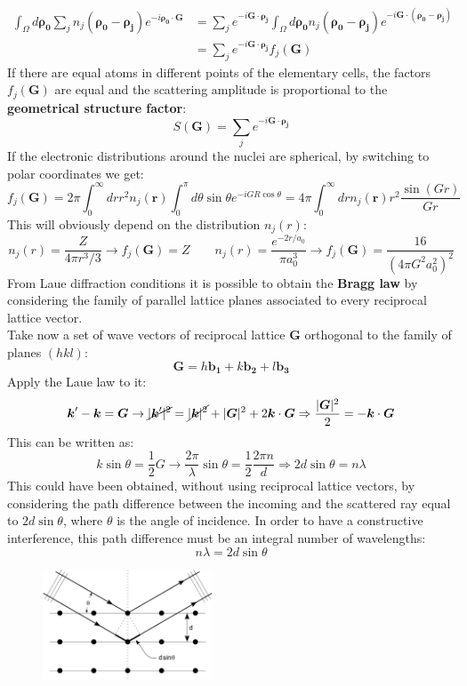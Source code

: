 \documentclass[10.75pt,a4paper,openright,bottom=2cm]{article}
\renewcommand{\Vec}[1]{\boldsymbol{#1}}
\begin{document}
\begin{align*}
\int_\Omega d\Vec{\rho_0}\sum_jn_j(\Vec{\rho_0}-\Vec{\rho_j})e^{-i\Vec{\rho_0}\cdot\Vec{G}}&=\sum_je^{-i\Vec{G}\cdot\Vec{\rho_j}}\int_\Omega d\Vec{\rho_0}n_j(\Vec{\rho_0}-\Vec{\rho_j})e^{-i\Vec{G}\cdot(\Vec{\rho_0}-\Vec{\rho_j})}\\
&=\sum_je^{-i\Vec{G}\cdot\Vec{\rho_j}}f_j(\Vec{G})
\end{align*}
If there are equal atoms in different points of the elementary cells, the factors $f_j(\Vec{G})$ are equal and the scattering amplitude is proportional to the \textbf{geometrical structure factor}:
\[
S(\Vec{G})=\sum_je^{-i\Vec{G}\cdot\Vec{\rho_j}}
\]
If the electronic distributions around the nuclei are spherical, by switching to polar coordinates we get:
\[
f_j(\Vec{G})=2\pi\int_0^\infty drr^2n_j(\Vec{r})\int_0^\pi d\theta\sin\theta e^{-iGR\cos\theta}=4\pi\int_0^\infty drn_j(\Vec{r})r^2\frac{\sin(Gr)}{Gr}
\]
This will obviously depend on the distribution $n_j(r)$:
\[
n_j(r)=\frac{Z}{4\pi r^3/3}\to f_j(\Vec{G})=Z \qquad n_j(r)=\frac{e^{-2r/a_0}}{\pi a_0^3}\to f_j(\Vec{G})=\frac{16}{(4\pi G^2a_0^2)^2}
\]
From Laue diffraction conditions it is possible to obtain the \textbf{Bragg law} by considering the family of parallel lattice planes associated to every reciprocal lattice vector.\\
Take now a set of wave vectors of reciprocal lattice $\Vec{G}$ orthogonal to the family of planes $(hkl)$:
\[
\Vec{G}=h\Vec{b_1}+k\Vec{b_2}+l\Vec{b_3}
\]
Apply the Laue law to it:
\[
\Vec{k}'-\Vec{k}=\Vec{G}\to\cancel{|\Vec{k}'|^2}=\cancel{|\Vec{k}|^2}+|\Vec{G}|^2+2\Vec{k}\cdot\Vec{G}\Rightarrow\frac{|\Vec{G}|^2}{2}=-\Vec{k}\cdot\Vec{G}
\]
This can be written as:
\[
k\sin\theta=\frac{1}{2}G\to\frac{2\pi}{\lambda}\sin\theta=\frac{1}{2}\frac{2\pi n}{d}\Rightarrow2d\sin\theta=n\lambda
\]
This could have been obtained, without using reciprocal lattice vectors, by considering the path difference between the incoming and the scattered ray equal to $2d\sin\theta$, where $\theta$ is the angle of incidence. In order to have a constructive interference, this path difference must be an integral number of wavelengths:
\[
n\lambda=2d\sin\theta
\]
\begin{figure}[h]
    \centering
    \includegraphics[width=0.45\textwidth]{bragg.png}
    \caption*{}
    \label{fig:bragg}
\end{figure}
\end{document}
